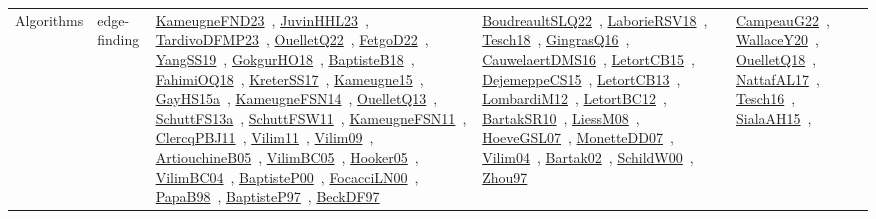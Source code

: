 {\begin{longtable}{lp{3cm}>{\raggedright\arraybackslash}p{6cm}>{\raggedright\arraybackslash}p{6cm}>{\raggedright\arraybackslash}p{8cm}}
Algorithms & edge-finding & \href{works/KameugneFND23.pdf}{KameugneFND23}~\cite{KameugneFND23}, \href{works/JuvinHHL23.pdf}{JuvinHHL23}~\cite{JuvinHHL23}, \href{works/TardivoDFMP23.pdf}{TardivoDFMP23}~\cite{TardivoDFMP23}, \href{works/OuelletQ22.pdf}{OuelletQ22}~\cite{OuelletQ22}, \href{works/FetgoD22.pdf}{FetgoD22}~\cite{FetgoD22}, \href{works/YangSS19.pdf}{YangSS19}~\cite{YangSS19}, \href{works/GokgurHO18.pdf}{GokgurHO18}~\cite{GokgurHO18}, \href{works/BaptisteB18.pdf}{BaptisteB18}~\cite{BaptisteB18}, \href{works/FahimiOQ18.pdf}{FahimiOQ18}~\cite{FahimiOQ18}, \href{works/KreterSS17.pdf}{KreterSS17}~\cite{KreterSS17}, \href{works/Kameugne15.pdf}{Kameugne15}~\cite{Kameugne15}, \href{works/GayHS15a.pdf}{GayHS15a}~\cite{GayHS15a}, \href{works/KameugneFSN14.pdf}{KameugneFSN14}~\cite{KameugneFSN14}, \href{works/OuelletQ13.pdf}{OuelletQ13}~\cite{OuelletQ13}, \href{works/SchuttFS13a.pdf}{SchuttFS13a}~\cite{SchuttFS13a}, \href{works/SchuttFSW11.pdf}{SchuttFSW11}~\cite{SchuttFSW11}, \href{works/KameugneFSN11.pdf}{KameugneFSN11}~\cite{KameugneFSN11}, \href{works/ClercqPBJ11.pdf}{ClercqPBJ11}~\cite{ClercqPBJ11}, \href{works/Vilim11.pdf}{Vilim11}~\cite{Vilim11}, \href{works/Vilim09.pdf}{Vilim09}~\cite{Vilim09}, \href{works/ArtiouchineB05.pdf}{ArtiouchineB05}~\cite{ArtiouchineB05}, \href{works/VilimBC05.pdf}{VilimBC05}~\cite{VilimBC05}, \href{works/Hooker05.pdf}{Hooker05}~\cite{Hooker05}, \href{works/VilimBC04.pdf}{VilimBC04}~\cite{VilimBC04}, \href{works/BaptisteP00.pdf}{BaptisteP00}~\cite{BaptisteP00}, \href{works/FocacciLN00.pdf}{FocacciLN00}~\cite{FocacciLN00}, \href{works/PapaB98.pdf}{PapaB98}~\cite{PapaB98}, \href{works/BaptisteP97.pdf}{BaptisteP97}~\cite{BaptisteP97}, \href{works/BeckDF97.pdf}{BeckDF97}~\cite{BeckDF97} & \href{works/BoudreaultSLQ22.pdf}{BoudreaultSLQ22}~\cite{BoudreaultSLQ22}, \href{works/LaborieRSV18.pdf}{LaborieRSV18}~\cite{LaborieRSV18}, \href{works/Tesch18.pdf}{Tesch18}~\cite{Tesch18}, \href{works/GingrasQ16.pdf}{GingrasQ16}~\cite{GingrasQ16}, \href{works/CauwelaertDMS16.pdf}{CauwelaertDMS16}~\cite{CauwelaertDMS16}, \href{works/LetortCB15.pdf}{LetortCB15}~\cite{LetortCB15}, \href{works/DejemeppeCS15.pdf}{DejemeppeCS15}~\cite{DejemeppeCS15}, \href{works/LetortCB13.pdf}{LetortCB13}~\cite{LetortCB13}, \href{works/LombardiM12.pdf}{LombardiM12}~\cite{LombardiM12}, \href{works/LetortBC12.pdf}{LetortBC12}~\cite{LetortBC12}, \href{works/BartakSR10.pdf}{BartakSR10}~\cite{BartakSR10}, \href{works/LiessM08.pdf}{LiessM08}~\cite{LiessM08}, \href{works/HoeveGSL07.pdf}{HoeveGSL07}~\cite{HoeveGSL07}, \href{works/MonetteDD07.pdf}{MonetteDD07}~\cite{MonetteDD07}, \href{works/Vilim04.pdf}{Vilim04}~\cite{Vilim04}, \href{works/Bartak02.pdf}{Bartak02}~\cite{Bartak02}, \href{works/SchildW00.pdf}{SchildW00}~\cite{SchildW00}, \href{works/Zhou97.pdf}{Zhou97}~\cite{Zhou97} & \href{works/CampeauG22.pdf}{CampeauG22}~\cite{CampeauG22}, \href{works/WallaceY20.pdf}{WallaceY20}~\cite{WallaceY20}, \href{works/OuelletQ18.pdf}{OuelletQ18}~\cite{OuelletQ18}, \href{works/NattafAL17.pdf}{NattafAL17}~\cite{NattafAL17}, \href{works/Tesch16.pdf}{Tesch16}~\cite{Tesch16}, \href{works/SialaAH15.pdf}{SialaAH15}~\cite{SialaAH15}, 
\end{longtable}}
